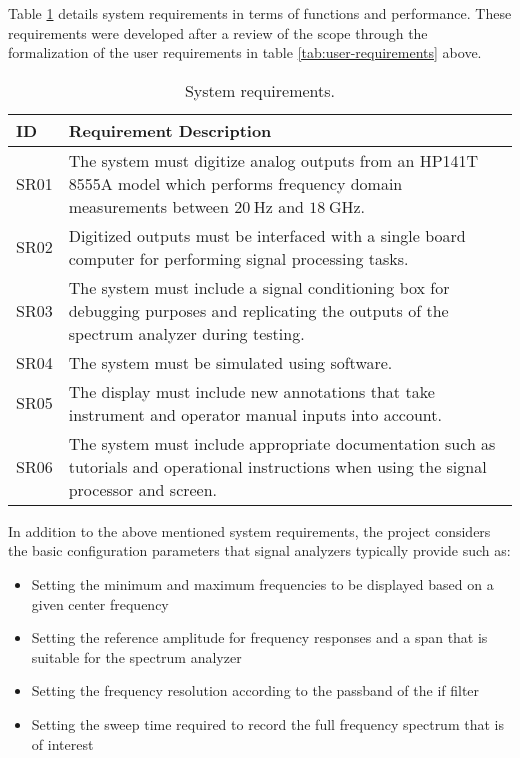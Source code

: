 \documentclass[class=report,11pt,crop=false]{standalone}
\begin{document}
Table \ref{tab:sys-requirements} details system requirements in terms of functions and performance. These requirements were developed after a review of the scope through the formalization of the user requirements in table \ref{tab:user-requirements} above.

\begin{table}[!ht]
	\centering
	\caption{System requirements.}
	\begin{tabular}{|m{5em}|m{40em}|}
		\hline
		\textbf{ID} & \textbf{Requirement Description}\\
		\hline
		SR01 	& The system must digitize analog outputs from an HP141T 8555A model which performs frequency domain measurements between $\SI{20}{\hertz}$ and $\SI{18}{\giga\hertz}$.\\
		\hline
		SR02	& Digitized outputs must be interfaced with a single board computer for performing signal processing tasks.\\
		\hline
		SR03	& The system must include a signal conditioning box for debugging purposes and replicating the outputs of the spectrum analyzer during testing.\\
		\hline
		SR04   & The system must be simulated using software.\\
		\hline
		SR05	& The display must include new annotations that take instrument and operator manual inputs into account. \\
		\hline
		SR06	& The system must include appropriate documentation such as tutorials and operational instructions when using the signal processor and screen.\\
		\hline
	\end{tabular}
\label{tab:sys-requirements}
\end{table}

In addition to the above mentioned system requirements, the project considers the basic configuration parameters that signal analyzers typically provide such as:
\begin{itemize}
	\item 
	Setting the minimum and maximum frequencies to be displayed based on a given center frequency 
	\item 
	Setting the reference amplitude for frequency responses and a span that is suitable for the spectrum analyzer
	\item 
	Setting the frequency resolution according to the passband of the \acrshort{if} filter
	\item 
	Setting the sweep time required to record the full frequency spectrum that is of interest
\end{itemize}
\end{document}
